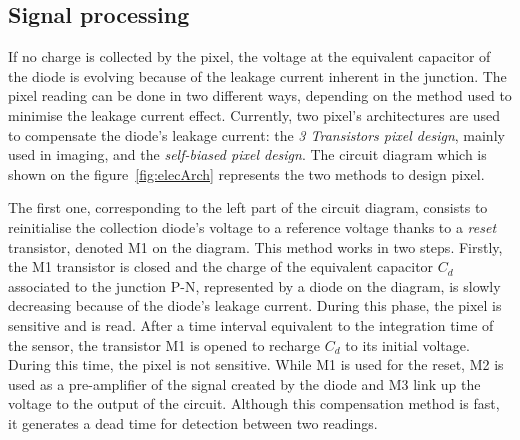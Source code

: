     \subsection{Signal processing}

    If no charge is collected by the pixel, the voltage at the equivalent capacitor of the diode is evolving because of the leakage current inherent in the junction.
    The pixel reading can be done in two different ways, depending on the method used to minimise the leakage current effect.
    Currently, two pixel's architectures are used to compensate the diode's leakage current: the \textit{3 Transistors pixel design}, mainly used in imaging, and the \textit{self-biased pixel design}.
    The circuit diagram which is shown on the figure~\ref{fig:elecArch} represents the two methods to design pixel.

    The first one, corresponding to the left part of the circuit diagram, consists to reinitialise the collection diode's voltage to a reference voltage thanks to a \textit{reset} transistor, denoted M1 on the diagram.
    This method works in two steps. 
    Firstly, the M1 transistor is closed and the charge of the equivalent capacitor $C_d$ associated to the junction P-N, represented by a diode on the diagram, is slowly decreasing because of the diode's leakage current. 
    During this phase, the pixel is sensitive and is read.
    After a time interval equivalent to the integration time of the sensor, the transistor M1 is opened to recharge $C_d$ to its initial voltage.
    During this time, the pixel is not sensitive.
    While M1 is used for the reset, M2 is used as a pre-amplifier of the signal created by the diode and M3 link up the voltage to the output of the circuit.
    Although this compensation method is fast, it generates a dead time for detection between two readings.
    
    
